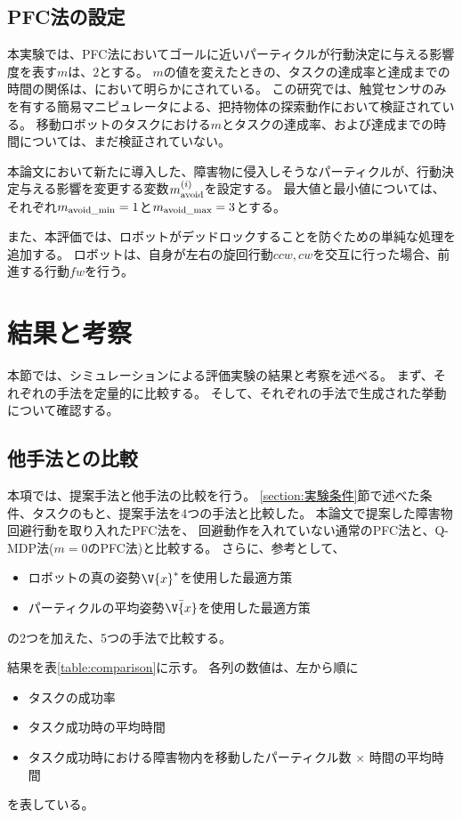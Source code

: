 \subsection{PFC法の設定}
本実験では、PFC法においてゴールに近いパーティクルが行動決定に与える影響度を表す$m$は、$2$とする。
$m$の値を変えたときの、タスクの達成率と達成までの時間の関係は、\cite{ueda2018searching}において明らかにされている。
この研究では、触覚センサのみを有する簡易マニピュレータによる、把持物体の探索動作において検証されている。
移動ロボットのタスクにおける$m$とタスクの達成率、および達成までの時間については、まだ検証されていない。

本論文において新たに導入した、障害物に侵入しそうなパーティクルが、行動決定与える影響を変更する変数$m^{(i)}_{\rm avoid}$を設定する。
最大値と最小値については、それぞれ$m_{\rm avoid\_min} = 1$と$m_{\rm avoid\_max} = 3$とする。

また、本評価では、ロボットがデッドロックすることを防ぐための単純な処理を追加する。
ロボットは、自身が左右の旋回行動$ccw, cw$を交互に行った場合、前進する行動$fw$を行う。


\section{結果と考察} \label{section:結果}
本節では、シミュレーションによる評価実験の結果と考察を述べる。
まず、それぞれの手法を定量的に比較する。
そして、それぞれの手法で生成された挙動について確認する。

\subsection{他手法との比較}
本項では、提案手法と他手法の比較を行う。
\ref{section:実験条件}節で述べた条件、タスクのもと、提案手法を4つの手法と比較した。
本論文で提案した障害物回避行動を取り入れたPFC法を、
回避動作を入れていない通常のPFC法と、Q-MDP法($m=0$のPFC法)と比較する。
さらに、参考として、
\begin{itemize}
  \item ロボットの真の姿勢$\V{x}^{*}$を使用した最適方策
  \item パーティクルの平均姿勢$\bar{\V{x}}$を使用した最適方策
\end{itemize}
の2つを加えた、5つの手法で比較する。

結果を表\ref{table:comparison}に示す。
各列の数値は、左から順に
\begin{itemize}
  \item タスクの成功率
  \item タスク成功時の平均時間
  \item タスク成功時における障害物内を移動したパーティクル数 $\times$ 時間の平均時間
\end{itemize}
を表している。

